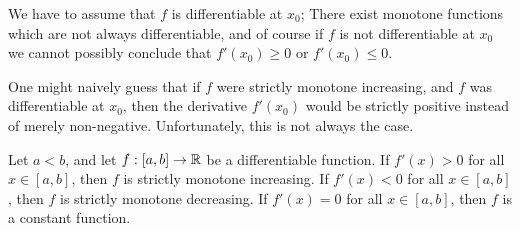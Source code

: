 \begin{rmk}\label{10.3.2}
  We have to assume that \(f\) is differentiable at \(x_0\);
  There exist monotone functions which are not always differentiable, and of course if \(f\) is not differentiable at \(x_0\) we cannot possibly conclude that \(f'(x_0) \geq 0\) or \(f'(x_0) \leq 0\).
\end{rmk}

\begin{note}
  One might naively guess that if \(f\) were strictly monotone increasing, and \(f\) was differentiable at \(x_0\), then the derivative \(f'(x_0)\) would be strictly positive instead of merely non-negative.
  Unfortunately, this is not always the case.
\end{note}

\begin{prop}\label{10.3.3}
  Let \(a < b\), and let \(f : [a, b] \to \mathbb{R}\) be a differentiable function.
  If \(f'(x) > 0\) for all \(x \in [a, b]\), then \(f\) is strictly monotone increasing.
  If \(f'(x) < 0\) for all \(x \in [a, b]\), then \(f\) is strictly monotone decreasing.
  If \(f'(x) = 0\) for all \(x \in [a, b]\), then \(f\) is a constant function.
\end{prop}

